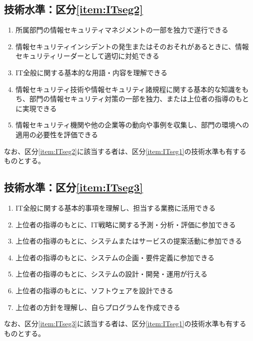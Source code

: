\subsection{技術水準：区分\ref{item:ITseg2}}
\begin{enumerate}
\item 所属部門の情報セキュリティマネジメントの一部を独力で遂行できる
\item {}情報セキュリティインシデントの発生またはそのおそれがあるときに、情報セキュリティリーダーとして適切に対処できる
\item IT全般に関する基本的な用語・内容を理解できる
\item 情報セキュリティ技術や情報セキュリティ諸規程に関する基本的な知識をもち、部門の情報セキュリティ対策の一部を独力、または上位者の指導のもとに実現できる
\item 情報セキュリティ機関や他の企業等の動向や事例を収集し、部門の環境への適用の必要性を評価できる
\end{enumerate}
なお、区分\ref{item:ITseg2}\hx に該当する者は、区分\ref{item:ITseg1}\hx の技術水準も有するものとする。

\subsection{技術水準：区分\ref{item:ITseg3}}
\begin{enumerate}
\item IT全般に関する基本的事項を理解し、担当する業務に活用できる
\item 上位者の指導のもとに、IT戦略に関する予測・分析・評価に参加できる
\item 上位者の指導のもとに、システムまたはサービスの提案活動に参加できる
\item 上位者の指導のもとに、システムの企画・要件定義に参加できる
\item 上位者の指導のもとに、システムの設計・開発・運用が行える
\item 上位者の指導のもとに、ソフトウェアを設計できる
\item 上位者の方針を理解し、自らプログラムを作成できる
\end{enumerate}
なお、区分\ref{item:ITseg3}\hx に該当する者は、区分\ref{item:ITseg1}\hx の技術水準も有するものとする。

